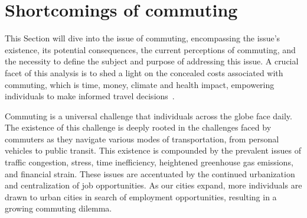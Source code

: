 \section{Shortcomings of commuting}\label{sec:shortcomings-of-commuting}

This Section will dive into the issue of commuting, encompassing the issue's existence, its potential consequences,
the current perceptions of commuting, and the necessity to define the subject and purpose of addressing this issue.
A crucial facet of this analysis is to shed a light on the concealed costs associated with commuting, which is time,
money, climate and health impact, empowering individuals to make informed travel decisions~\cite{alma9921355859805762}.

Commuting is a universal challenge that individuals across the globe face daily.
The existence of this challenge is deeply rooted in the challenges faced by commuters as they navigate various modes of
transportation, from personal vehicles to public transit.
This existence is compounded by the prevalent issues of traffic congestion, stress, time inefficiency, heightened
greenhouse gas emissions, and financial strain.
These issues are accentuated by the continued urbanization and centralization of job opportunities.
As our cities expand, more individuals are drawn to urban cities in search of employment opportunities, resulting in a
growing commuting dilemma.

